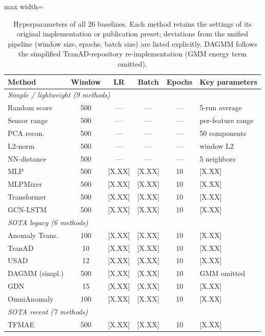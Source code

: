 \begin{table}[tp]
\footnotesize
\centering
\caption{Hyperparameters of all 26 baselines.
  Each method retains the settings of its original implementation or publication preset;
  deviations from the unified pipeline (window size, epochs, batch size) are listed explicitly.
  DAGMM follows the simplified TranAD-repository re-implementation (GMM energy term omitted).}
\label{tab:baseline_hparams}
\begin{adjustbox}{max width=\linewidth}
\begin{tabular}{lccccl}
\toprule
Method & Window & LR & Batch & Epochs & Key parameters \\
\midrule
\multicolumn{6}{l}{\textit{Simple / lightweight (9 methods)}} \\
Random score   & 500 & --- & --- & --- & 5-run average \\
Sensor range   & 500 & --- & --- & --- & per-feature range \\
PCA recon.     & 500 & --- & --- & --- & 50 components \\
L2-norm        & 500 & --- & --- & --- & window L2 \\
NN-distance    & 500 & --- & --- & --- & 5 neighbors \\
MLP            & 500 & {[X.XX]} & {[X.XX]} & 10 & {[X.XX]} \\
MLPMixer       & 500 & {[X.XX]} & {[X.XX]} & 10 & {[X.XX]} \\
Transformer    & 500 & {[X.XX]} & {[X.XX]} & 10 & {[X.XX]} \\
GCN-LSTM       & 500 & {[X.XX]} & {[X.XX]} & 10 & {[X.XX]} \\
\midrule
\multicolumn{6}{l}{\textit{SOTA legacy (6 methods)}} \\
Anomaly Trans. & 100 & {[X.XX]} & {[X.XX]} & 10 & {[X.XX]} \\
TranAD         & 10  & {[X.XX]} & {[X.XX]} & 10 & {[X.XX]} \\
USAD           & 12  & {[X.XX]} & {[X.XX]} & 10 & {[X.XX]} \\
DAGMM (simpl.) & 500 & {[X.XX]} & {[X.XX]} & 10 & GMM omitted \\
GDN            & 15  & {[X.XX]} & {[X.XX]} & 10 & {[X.XX]} \\
OmniAnomaly    & 100 & {[X.XX]} & {[X.XX]} & 10 & {[X.XX]} \\
\midrule
\multicolumn{6}{l}{\textit{SOTA recent (7 methods)}} \\
TFMAE          & 500 & {[X.XX]} & {[X.XX]} & 10 & {[X.XX]} \\

\end{tabular}
\end{adjustbox}
\end{table}
